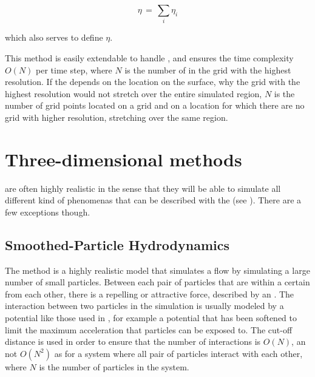 \begin{equation} \label{eq:laplacian_pyramid_composition}
\eta \,=\, \sum_i \eta_i
\end{equation}

which also serves to define $\eta$.

This method is easily extendable to handle \FSI, and ensures the time complexity $O(N)$ per time step, where $N$ is the number of  in the grid with the highest resolution. If the  depends on the location on the surface, why the grid with the highest resolution would not stretch over the entire simulated region, $N$ is the number of grid points located on a grid and on a location for which there are no grid with higher resolution, stretching over the same region.

\section{Three-dimensional methods}

 are often highly realistic in the sense that they will be able to simulate all different kind of phenomenas that can be described with the  (see ). There are a few exceptions though.

\subsection{Smoothed-Particle Hydrodynamics}

The \SPH method is a highly realistic model that simulates a flow by simulating a large number of small particles. Between each pair of particles that are within a certain  from each other, there is a repelling or attractive force, described by an \ODE. The interaction between two particles in the simulation is usually modeled by a potential like those used in \MD, for example a \LJ potential that has been softened to limit the maximum acceleration that particles can be exposed to. The cut-off distance is used in order to ensure that the number of interactions is $O(N)$, an not $O(N^2)$ as for a system where all pair of particles interact with each other, where $N$ is the number of particles in the system.

